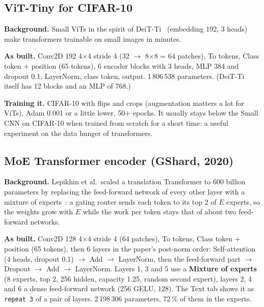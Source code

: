 \documentclass[11pt,a4paper]{article}
\newcommand{\ui}[1]{\textbf{\textsf{#1}}}
\begin{document}
\subsection{ViT-Tiny for CIFAR-10}
\textbf{Background.} Small ViTs in the spirit of DeiT-Ti~\cite{touvron2020deit} (embedding 192, 3 heads) make transformers trainable
on small images in minutes.

\textbf{As built.} Conv2D 192 4$\times$4 stride 4 (32 $\rightarrow$ 8$\times$8 = 64 patches), To tokens, Class token + position (65
tokens), 6 encoder blocks with 3 heads, MLP 384 and dropout 0.1, LayerNorm, class token, output. 1\,806\,538 parameters. (DeiT-Ti itself
has 12 blocks and an MLP of 768.)

\textbf{Training it.} CIFAR-10 with flips and crops (augmentation matters a lot for ViTs), Adam 0.001 or a little lower, 50+ epochs. It
usually stays below the Small CNN on CIFAR-10 when trained from scratch for a short time: a useful experiment on the data hunger of
transformers.

\subsection{MoE Transformer encoder (GShard, 2020)}
\textbf{Background.} Lepikhin et al.\ scaled a translation Transformer to 600 billion parameters by replacing the feed-forward network of
every other layer with a mixture of experts~\cite{lepikhin2020gshard}: a gating router sends each token to its top 2 of $E$ experts, so
the weights grow with $E$ while the work per token stays that of about two feed-forward networks.

\textbf{As built.} Conv2D 128 4$\times$4 stride 4 (64 patches), To tokens, Class token + position (65 tokens), then 6 layers in the
paper's post-norm order: Self-attention (4 heads, dropout 0.1) $\rightarrow$ Add $\rightarrow$ LayerNorm, then the feed-forward part
$\rightarrow$ Dropout $\rightarrow$ Add $\rightarrow$ LayerNorm. Layers 1, 3 and 5 use a \ui{Mixture of experts} (8 experts, top 2,
256 hidden, capacity 1.25, random second expert), layers 2, 4 and 6 a dense feed-forward network (256 GELU, 128). The Text tab shows it as
\texttt{repeat 3} of a pair of layers. 2\,198\,306 parameters, 72\,\% of them in the experts.
\end{document}
